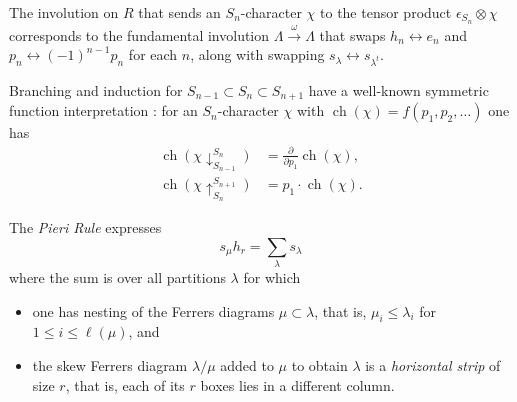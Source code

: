\documentclass[12pt]{amsart}
\theoremstyle{plain}
\theoremstyle{definition}
\begin{document}
The involution on $R$ that sends an $S_n$-character $\chi$ to
the tensor product $\epsilon_{S_n} \otimes \chi$ corresponds to
the fundamental involution 
$\Lambda \overset{\omega}{\longrightarrow} \Lambda$
that 
swaps $h_n \leftrightarrow e_n$ and
$p_n \leftrightarrow (-1)^{n-1} p_n$ for each $n$,
along with swapping $s_\lambda \leftrightarrow s_{\lambda^t}$.

Branching and induction for $S_{n-1} \subset S_n \subset S_{n+1}$
have a well-known symmetric function interpretation
\cite[Examples I.5.3(c), I.8.26]{Macdonald}: for
an $S_n$-character $\chi$ with ${{\operatorname{ch}}}(\chi)=f(p_1,p_2,\ldots)$ one has
\begin{equation}
\label{induction-restriction-in-power-sums}
\begin{aligned}
{{\operatorname{ch}}}\left(\chi\downarrow^{S_n}_{S_{n-1}}\right) 
  &= \frac{\partial}{\partial p_1} {{\operatorname{ch}}}(\chi), \\
{{\operatorname{ch}}}\left(\chi\uparrow^{S_{n+1}}_{S_n} \right) 
  &= p_1 \cdot {{\operatorname{ch}}}(\chi).
\end{aligned}
\end{equation}

The {\it Pieri Rule} expresses  
\begin{equation}
\label{Pieri-rule}
s_{\mu } h_{r}=\sum_{\lambda } s_{\lambda }
\end{equation}
where the sum is over all partitions $\lambda$ for which 
\begin{itemize}
\item one has nesting of the Ferrers diagrams $\mu \subset \lambda$,
that is, $\mu_i \leq \lambda_i$ for $1 \leq i \leq \ell(\mu)$,
and 
\item the skew Ferrers diagram $\lambda/\mu$ added to $\mu$ to obtain
$\lambda$ is a {\it horizontal strip} of size $r$, that is,
each of its $r$ boxes lies in a different column.  
\end{itemize}
\end{document}
